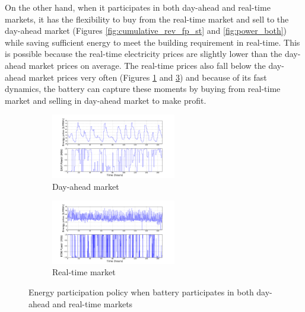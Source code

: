 \documentclass[11pt,twoside]{article}
\begin{document}
On the other hand, when it participates in both day-ahead and real-time markets, it has the flexibility to buy from the real-time market and sell to the day-ahead market  (Figures \ref{fig:cumulative_rev_fp_st} and \ref{fig:power_both}) while saving sufficient energy to meet the building requirement in real-time. This is possible because the real-time electricity prices are slightly lower than the day-ahead market prices on average. The real-time prices also fall below the day-ahead market prices very often (Figures \ref{fig:Pdam_fp_st} and \ref{fig:Prtm_fp_st}) and because of its fast dynamics, the battery can capture these moments by buying from real-time market and selling in day-ahead market to make profit. 

\begin{figure}[h!]\label{fig:power_both}
\begin{subfigure}{\textwidth}
\centering
\includegraphics[width=0.6\textwidth]{Figures/Plots/fullproblem_stoch/Pdam_fp_st.pdf} \caption{Day-ahead market}\label{fig:Pdam_fp_st}
\end{subfigure}
\begin{subfigure}{\textwidth}
\centering
\includegraphics[width=0.6\textwidth]{Figures/Plots/fullproblem_stoch/Prtm_fp_st.pdf} \caption{Real-time market}\label{fig:Prtm_fp_st}
\end{subfigure}
\caption{Energy participation policy when battery participates in both day-ahead and real-time markets}
\end{figure}
\FloatBarrier
\end{document}
